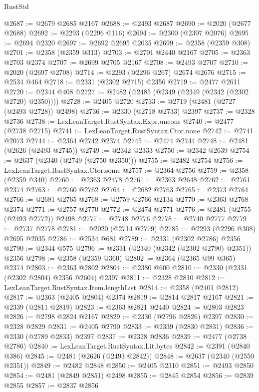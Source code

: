 \begin{lexlean}{RustStd}
\begin{coremodule}
@2687 := @2679 @2685 @2167
@2688 := @2493 @2687
@2690 := @2020 (@2677 @2688)
@2692 := @2293 (@2296 @116)
@2694 := @2300 (@2307 @2076)
@2695 := @2694 @2320
@2697 := @2692 @2695 @2035
@2699 := @2358 (@2359 @308)
@2701 := @2358 (@2359 @313)
@2703 := @2701 @2440 @2167
@2705 := @2363 @2703 @2374
@2707 := @2699 @2705 @2167
@2708 := @2493 @2707
@2710 := @2020 (@2697 @2708)
@2714 := @2293 (@2296 @267) @2674 @2676
@2715 := @2534 @464
@2718 := @2331 (@2302 @2715) @2356
@2719 := @2477 @2611
@2720 := @2344 @408
@2727 := @2482 (@2485 (@2349 (@2349 (@2342 (@2302 @2720) @2350))))
@2728 := @2405 @2720
@2733 := @2719 (@2481 (@2727 (@2493 @2728)) @2498)
@2736 := @2330 (@2718 @2733) @2397
@2737 := @2328 @2736
@2738 := LexLeanTarget.RustSyntax.Expr.uncons
@2740 := @2477 (@2738 @2715)
@2741 := LexLeanTarget.RustSyntax.Ctor.none
@2742 := @2741 @2073
@2744 := @2364 @2742 @2374
@2745 := @2474 @2744
@2748 := @2481 (@2626 (@2493 @2745))
@2749 := @2342 @2333
@2750 := @2342 @2639
@2754 := @2637 (@2340 (@2749 (@2750 @2350)))
@2755 := @2482 @2754
@2756 := LexLeanTarget.RustSyntax.Ctor.some
@2757 := @2364 @2756
@2759 := @2358 (@2359 @340)
@2760 := @2363 @2478
@2761 := @2363 @2648
@2762 := @2761 @2374
@2763 := @2760 @2762
@2764 := @2682 @2763
@2765 := @2373 @2764
@2766 := @2681 @2765
@2768 := @2759 @2766 @2134
@2770 := @2363 @2768 @2374
@2771 := @2757 @2770
@2772 := @2474 @2771
@2776 := @2481 (@2755 (@2493 @2772)) @2498
@2777 := @2748 @2776
@2778 := @2740 @2777
@2779 := @2737 @2778
@2781 := @2020 (@2714 @2779)
@2785 := @2293 (@2296 @308) @2695 @2035
@2786 := @2534 @681
@2789 := @2331 (@2302 @2786) @2356
@2790 := @2344 @575
@2796 := @2331 (@2340 (@2342 (@2302 @2790) @2351)) @2356
@2798 := @2358 (@2359 @360)
@2802 := @2364 (@2365 @99 @365) @2374
@2803 := @2363 @2802
@2804 := @2380 @600
@2810 := @2330 (@2331 (@2302 @2804) @2356 @2604) @2397
@2811 := @2328 @2810
@2812 := LexLeanTarget.RustSyntax.Item.lengthList
@2814 := @2358 (@2401 @2812)
@2817 := @2363 (@2405 @2804) @2374
@2819 := @2814 @2817 @2167
@2821 := @2339 (@2811 @2819)
@2823 := @2363 @2821 @2440
@2824 := @2803 @2823
@2826 := @2798 @2824 @2167
@2829 := @2330 (@2796 @2826) @2397
@2830 := @2328 @2829
@2831 := @2405 @2790
@2833 := @2339 (@2830 @2831)
@2836 := @2330 (@2789 @2833) @2397
@2837 := @2328 @2836
@2839 := @2477 (@2738 @2786)
@2840 := LexLeanTarget.RustSyntax.Lit.bytes
@2842 := @2391 (@2840 @386)
@2845 := @2481 (@2626 (@2493 @2842))
@2848 := @2637 (@2340 (@2550 @2351))
@2849 := @2482 @2848
@2850 := @2405 @2310
@2851 := @2493 @2850
@2854 := @2481 (@2849 @2851) @2498
@2855 := @2845 @2854
@2856 := @2839 @2855
@2857 := @2837 @2856

\end{coremodule}
\end{lexlean}
